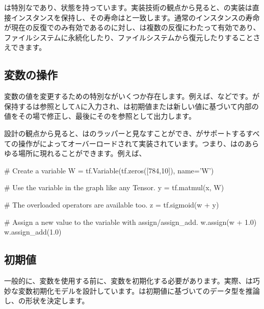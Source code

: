 \begin{content}

は特別なであり、状態を持っています。実装技術の観点から見ると、の実装は直接インスタンスを保持し、その寿命はと一致します。通常のインスタンスの寿命が現在の反復でのみ有効であるのに対し、は複数の反復にわたって有効であり、ファイルシステムに永続化したり、ファイルシステムから復元したりすることさえできます。

\subsection{変数の操作}

変数の値を変更するための特別ながいくつか存在します。例えば、などです。が保持するは参照としてAに入力され、は初期値または新しい値に基づいて内部の値をその場で修正し、最後にそのを参照として出力します。

設計の観点から見ると、はのラッパーと見なすことができ、がサポートするすべての操作がによってオーバーロードされて実装されています。つまり、はのあらゆる場所に現れることができます。例えば、

\begin{leftbar}
\begin{python}
# Create a variable
W = tf.Variable(tf.zeros([784,10]), name='W')

# Use the variable in the graph like any Tensor.
y = tf.matmul(x, W)

# The overloaded operators are available too.
z = tf.sigmoid(w + y)

# Assign a new value to the variable with assign/assign\_add.
w.assign(w + 1.0)
w.assign_add(1.0)
\end{python}
\end{leftbar}

\subsection{初期値}

一般的に、変数を使用する前に、変数を初期化する必要があります。実際、は巧妙な変数初期化モデルを設計しています。は初期値に基づいてのデータ型を推論し、の形状を決定します。


\end{content}
